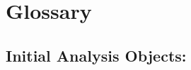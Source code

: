 \documentclass{article}
\begin{document}
\section{Glossary}
	\subsection{Initial Analysis Objects:}
\end{document}
